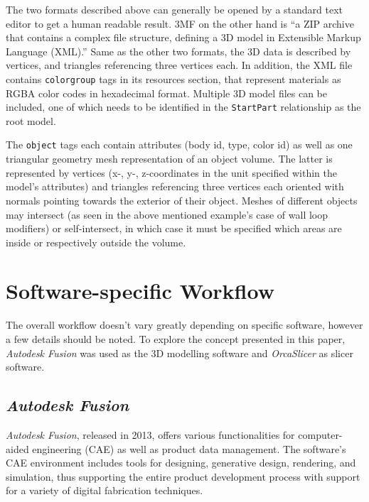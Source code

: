 

The two formats described above can generally be opened by a standard text editor to get a human readable result. 
3MF on the other hand is ``a ZIP archive that contains a complex file structure, defining a 3D model in Extensible Markup Language (XML).''\cite{rossel_security_2023}
Same as the other two formats, the 3D data is described by vertices, and triangles referencing three vertices each.
In addition, the XML file contains \texttt{colorgroup} tags in its resources section, that represent materials as RGBA color codes in hexadecimal format. 
Multiple 3D model files can be included, one of which needs to be identified in the \texttt{StartPart} relationship as the root model.

The \texttt{object} tags each contain attributes (body id, type, color id) as well as one triangular geometry mesh representation of an object volume. 
The latter is represented by vertices (x-, y-, z-coordinates in the unit specified within the model's attributes) and triangles referencing three vertices each oriented with normals pointing towards the exterior of their object.\cite{3mf_consortium_3mf_2025}
Meshes of different objects may intersect (as seen in the above mentioned example's case of wall loop modifiers) or self-intersect, in which case it must be specified which areas are inside or respectively outside the volume. 

\section{Software-specific Workflow}

The overall workflow doesn't vary greatly depending on specific software, however a few details should be noted. 
To explore the concept presented in this paper, \textit{Autodesk Fusion} was used as the 3D modelling software and \textit{OrcaSlicer} as slicer software.

\subsection{\textit{Autodesk Fusion}}

\textit{Autodesk Fusion}, released in 2013, offers various functionalities for computer-aided engineering (CAE) as well as product data management. 
The software's CAE environment includes tools for designing, generative design, rendering, and simulation, thus supporting the entire product development process with support for a variety of digital fabrication techniques\cite[p.~2]{junk_autodesk_2025}.  


